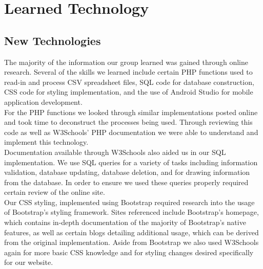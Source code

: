 \documentclass[onecolumn, draftclsnofoot,10pt, compsoc]{IEEEtran}
\begin{document}
\section{Learned Technology}
\subsection{New Technologies}
\noindent The majority of the information our group learned was gained through online research. 
Several of the skills we learned include certain PHP functions used to read-in and process CSV spreadsheet files, SQL code for database construction, CSS code for styling implementation, and the use of Android Studio for mobile application development.
\\ 

\noindent For the PHP functions we looked through similar implementations posted online and took time to deconstruct the processes being used. Through reviewing this code as well as W3Schools' PHP documentation we were able to understand and implement this technology.
\\ 

\noindent Documentation available through W3Schools also aided us in our SQL implementation. We use SQL queries for a variety of tasks including information validation, database updating, database deletion, and for drawing information from the database. In order to ensure we used these queries properly required certain review of the online site. 
\\ 

\noindent Our CSS styling, implemented using Bootstrap required research into the usage of Bootstrap's styling framework. Sites referenced include Bootstrap's homepage, which contains in-depth documentation of the majority of Bootstrap's native features, as well as certain blogs detailing additional usage, which can be derived from the original implementation. Aside from Bootstrap we also used W3Schools again for more basic CSS knowledge and for styling changes desired specifically for our website.\\
\end{document}
